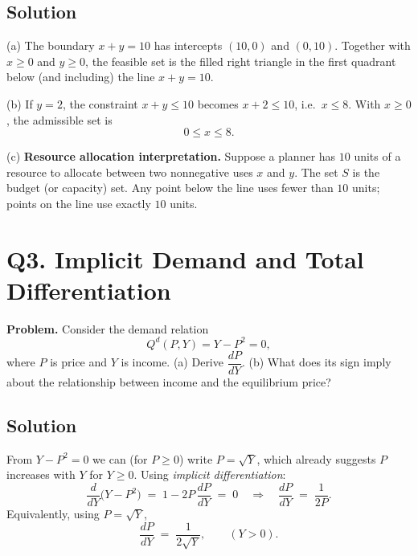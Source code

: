 \documentclass[12pt]{article}
\begin{document}
\subsection*{Solution}
(a) The boundary $x+y=10$ has intercepts $(10,0)$ and $(0,10)$. Together with $x\ge 0$ and $y\ge 0$, the feasible set is the filled right triangle in the first quadrant below (and including) the line $x+y=10$.

\begin{center}
\end{center}

(b) If $y=2$, the constraint $x+y\le 10$ becomes $x+2\le 10$, i.e.\ $x\le 8$. With $x\ge 0$, the admissible set is
\[
0 \le x \le 8.
\]

(c) \textbf{Resource allocation interpretation.} Suppose a planner has $10$ units of a resource to allocate between two nonnegative uses $x$ and $y$. The set $S$ is the budget (or capacity) set. Any point below the line uses fewer than $10$ units; points on the line use exactly $10$ units.

\bigskip
\newpage

\section*{Q3.  Implicit Demand and Total Differentiation}
\textbf{Problem. } Consider the demand relation
\[
Q^d(P,Y) = Y - P^2 = 0,
\]
where $P$ is price and $Y$ is income.
(a) Derive $\dfrac{dP}{dY}$. \;
(b) What does its sign imply about the relationship between income and the equilibrium price?

\subsection*{Solution}
From $Y - P^2 = 0$ we can (for $P\ge 0$) write $P=\sqrt{Y}$, which already suggests $P$ increases with $Y$ for $Y\ge 0$. Using \emph{implicit differentiation}:
\[
\frac{d}{dY}\big(Y - P^2\big) \;=\; 1 - 2P\,\frac{dP}{dY} \;=\; 0
\quad\Longrightarrow\quad
\frac{dP}{dY} \;=\; \frac{1}{2P}.
\]
Equivalently, using $P=\sqrt{Y}$,
\[
\frac{dP}{dY} \;=\; \frac{1}{2\sqrt{Y}}, \qquad (Y>0).
\]
\end{document}
